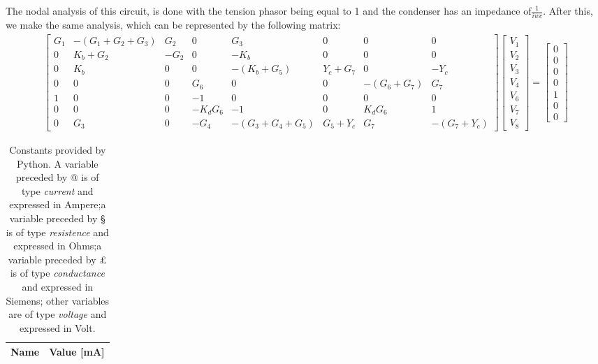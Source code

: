The nodal analysis of this circuit, is done with the tension phasor being equal to 1 and the condenser has an impedance of$\frac{1}{iwc}$.
After this, we make the same analysis, which can be represented by the following matrix:
\begin{gather}
	\begin{bmatrix}
		G_1 & -(G_1 + G_2 + G_3) & G_2 & 0 & G_3 & 0 & 0 & 0 \\ 
		0 & K_b + G_2 & -G_2 & 0 & -K_b & 0 & 0 & 0 \\
		0 & K_b & 0 & 0 & -(K_b + G_5) & Y_c + G_7 & 0 & -Y_c \\ 
		0 & 0 & 0 & G_6 & 0 & 0 & -(G_6 + G_7) & G_7 \\
		1 & 0 & 0 & -1 & 0 & 0 & 0 & 0 \\
		0 & 0 & 0 & -K_dG_6 & -1 & 0 & K_dG_6 & 1 \\
		0 & G_3 & 0 & -G_4 & -(G_3 + G_4 + G_5) & G_5 + Y_c & G_7 & -(G_7 + Y_c)
	\end{bmatrix}
	\begin{bmatrix} V_1 \\ V_2 \\ V_3 \\ V_4 \\ V_6 \\ V_7 \\ V_8 
	\end{bmatrix}
	=
	\begin{bmatrix} 0 \\ 0 \\ 0 \\ 0 \\ 1 \\ 0 \\ 0 
	\end{bmatrix}
\end{gather}

\begin{table}[!h]
	\centering
	\begin{tabular}{|l|r|}
		\hline    
		{\bf Name} & {\bf Value [mA]} \\ \hline
		
	\end{tabular}
	\caption{Constants provided by Python. A variable preceded by @ is of type {\em current}
		and expressed in Ampere;a variable preceded by § is of type {\it resistence} and expressed in
		Ohms;a variable preceded by £ is of type {\it conductance} and expressed in
		Siemens; other variables are of type {\it voltage} and expressed in
		Volt.}
	\label{tab:op}
\end{table}

